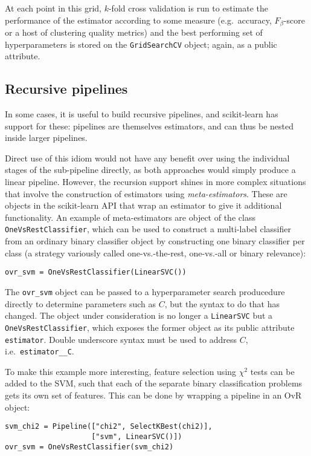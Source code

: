 \documentclass[a4paper,twocolumn]{article}
\begin{document}
At each point in this grid, $k$-fold cross validation is run
to estimate the performance of the estimator according to some measure
(e.g.\ accuracy, $F_\beta$-score or a host of clustering quality metrics)
and the best performing set of hyperparameters is stored
on the \texttt{GridSearchCV} object; again, as a public attribute.

\subsection{Recursive pipelines}

In some cases, it is useful to build recursive pipelines,
and scikit-learn has support for these:
pipelines are themselves estimators,
and can thus be nested inside larger pipelines.

Direct use of this idiom would not have any benefit
over using the individual stages of the sub-pipeline directly,
as both approaches would simply produce a linear pipeline.
However, the recursion support shines in more complex situations
that involve the construction of estimators using \textit{meta-estimators}.
These are objects in the scikit-learn API
that wrap an estimator to give it additional functionality.
An example of meta-estimators are object of the class
\texttt{OneVsRestClassifier},
which can be used to construct a multi-label classifier
\citep{tsoumakas2007multi}
from an ordinary binary classifier object
by constructing one binary classifier per class
(a strategy variously called one-vs.-the-rest,
one-vs.-all or binary relevance):

\begin{verbatim}
ovr_svm = OneVsRestClassifier(LinearSVC())
\end{verbatim}

The \texttt{ovr\_svm} object can be passed to a hyperparameter search
producedure directly to determine parameters such as $C$,
but the syntax to do that has changed.
The object under consideration is no longer a \texttt{LinearSVC}
but a \texttt{OneVsRestClassifier},
which exposes the former object as its public attribute \texttt{estimator}.
Double underscore syntax must be used to address $C$,
i.e.\ \texttt{estimator\_\_C}.

To make this example more interesting,
feature selection using $\chi^2$ tests can be added to the SVM,
such that each of the separate binary classification problems
gets its own set of features.
This can be done by wrapping a pipeline in an OvR object:

\begin{verbatim}
svm_chi2 = Pipeline(["chi2", SelectKBest(chi2)],
                    ["svm", LinearSVC()])
ovr_svm = OneVsRestClassifier(svm_chi2)
\end{verbatim}
\end{document}
